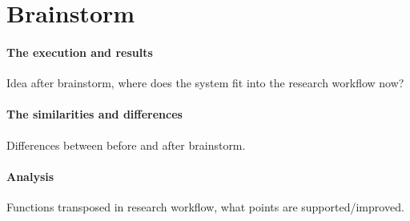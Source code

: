 \section{Brainstorm}
\paragraph{The execution and results}
Idea after brainstorm, where does the system fit into the research workflow now?
\paragraph{The similarities and differences}
Differences between before and after brainstorm.
\paragraph{Analysis}
Functions transposed in research workflow, what points are supported/improved.